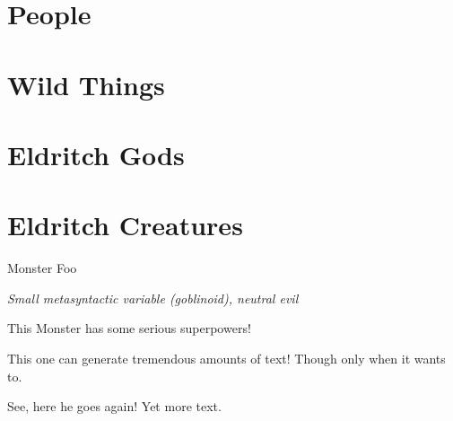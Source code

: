 \documentclass[./main.tex]{subfiles}
\begin{document}
\chapter{People}

\chapter{Wild Things}

\chapter{Eldritch Gods}


\chapter{Eldritch Creatures}
\begin{monsterbox}{Monster Foo}\label{monster:foo}
  \begin{hangingpar}
    \textit{Small metasyntactic variable (goblinoid), neutral evil}
  \end{hangingpar}
	\dndline%
	\basics[%
	armorclass = 12,
	hitpoints  = \dice{3d8 + 3},
	speed      = 50 ft
	]
	\dndline%
	\stats[
    STR = \stat{12}, %
    DEX = \stat{7}
	]
	\dndline%
	\details[%
	languages = {Common Lisp, Erlang}, 
	]
	\dndline%
	\begin{monsteraction}
		This Monster has some serious superpowers!
	\end{monsteraction}
	\begin{monsteraction}
		This one can generate tremendous amounts of text! Though only when it wants to.
	\end{monsteraction}

	\begin{monsteraction}
    See, here he goes again! Yet more text.
	\end{monsteraction}
\end{monsterbox}
\end{document}
